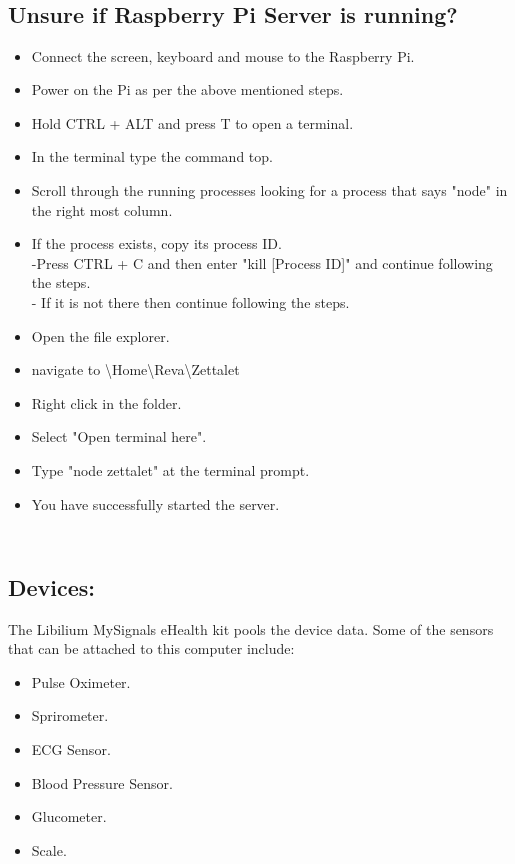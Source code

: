 	\subsection*{\\Unsure if Raspberry Pi Server is running?\\}
	
			\begin{itemize}
			\item Connect the screen, keyboard and mouse to the Raspberry Pi.
			\item Power on the Pi as per the above mentioned steps.
			\item Hold CTRL + ALT and press T to open a terminal.
			\item In the terminal type the command top.
			\item Scroll through the running processes looking for a process that says "node" in the right most column.
			\item If the process exists, copy its process ID.\\
				-Press CTRL + C and then enter "kill [Process ID]" and continue following the steps. \\ - If it is not there then continue following the steps.
			\item Open the file explorer.
			\item navigate to \textbackslash Home\textbackslash Reva\textbackslash Zettalet
			\item Right click in the folder.
			\item Select "Open terminal here".
			\item Type "node zettalet" at the terminal prompt.
			\item You have successfully started the server.
		\end{itemize}
		
		

	\subsection*{\\Devices:\\}
		The Libilium MySignals eHealth kit pools the device data. Some of the sensors that can be attached to this computer include: 
		\begin{itemize}
			\item Pulse Oximeter.
			\item Sprirometer.
			\item ECG Sensor.
			\item Blood Pressure Sensor. 
			\item Glucometer.
			\item Scale.
		\end{itemize}
		
